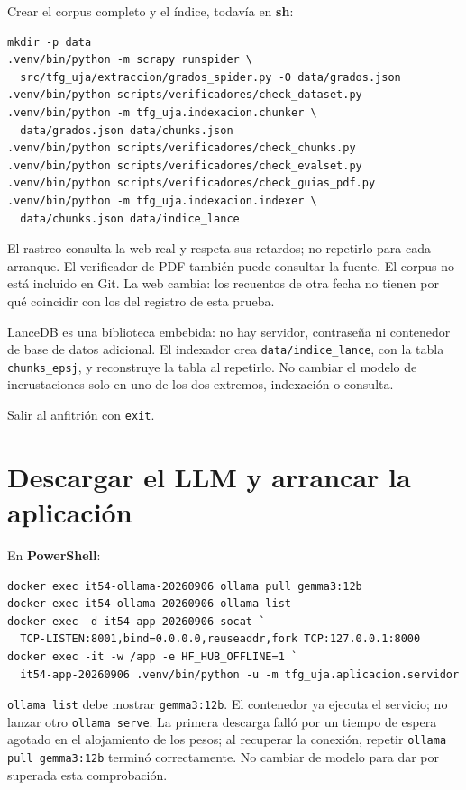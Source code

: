 Crear el corpus completo y el índice, todavía en \textbf{sh}:

\begingroup\footnotesize\begin{verbatim}
mkdir -p data
.venv/bin/python -m scrapy runspider \
  src/tfg_uja/extraccion/grados_spider.py -O data/grados.json
.venv/bin/python scripts/verificadores/check_dataset.py
.venv/bin/python -m tfg_uja.indexacion.chunker \
  data/grados.json data/chunks.json
.venv/bin/python scripts/verificadores/check_chunks.py
.venv/bin/python scripts/verificadores/check_evalset.py
.venv/bin/python scripts/verificadores/check_guias_pdf.py
.venv/bin/python -m tfg_uja.indexacion.indexer \
  data/chunks.json data/indice_lance
\end{verbatim}\endgroup

El rastreo consulta la web real y respeta sus retardos; no repetirlo para cada
arranque. El verificador de PDF también puede consultar la fuente.
El corpus no está incluido en Git. La web cambia: los recuentos de otra fecha
no tienen por qué coincidir con los del registro de esta prueba.

LanceDB es una biblioteca embebida: no hay servidor, contraseña ni contenedor
de base de datos adicional. El indexador crea \texttt{data/indice\_lance}, con la tabla
\texttt{chunks\_epsj}, y reconstruye la tabla al repetirlo. No cambiar el modelo de
incrustaciones solo en uno de los dos extremos, indexación o consulta.

Salir al anfitrión con \texttt{exit}.

\section{Descargar el LLM y arrancar la aplicación}

En \textbf{PowerShell}:

\begingroup\footnotesize\begin{verbatim}
docker exec it54-ollama-20260906 ollama pull gemma3:12b
docker exec it54-ollama-20260906 ollama list
docker exec -d it54-app-20260906 socat `
  TCP-LISTEN:8001,bind=0.0.0.0,reuseaddr,fork TCP:127.0.0.1:8000
docker exec -it -w /app -e HF_HUB_OFFLINE=1 `
  it54-app-20260906 .venv/bin/python -u -m tfg_uja.aplicacion.servidor
\end{verbatim}\endgroup

\texttt{ollama list} debe mostrar \texttt{gemma3:12b}. El contenedor ya ejecuta el servicio;
no lanzar otro \texttt{ollama serve}. La primera descarga falló por un tiempo de
espera agotado en el alojamiento de los pesos; al recuperar la conexión,
repetir \texttt{ollama pull gemma3:12b} terminó correctamente. No cambiar de modelo
para dar por superada esta comprobación.

